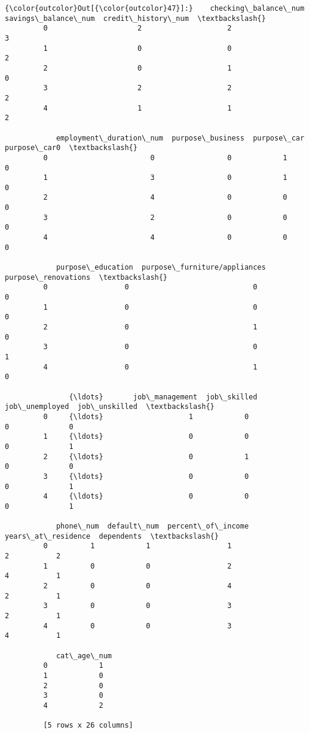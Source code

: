 \documentclass[11pt]{article}
\begin{document}
\begin{Verbatim}[commandchars=\\\{\}]
{\color{outcolor}Out[{\color{outcolor}47}]:}    checking\_balance\_num  savings\_balance\_num  credit\_history\_num  \textbackslash{}
         0                     2                    2                   3   
         1                     0                    0                   2   
         2                     0                    1                   0   
         3                     2                    2                   2   
         4                     1                    1                   2   
         
            employment\_duration\_num  purpose\_business  purpose\_car  purpose\_car0  \textbackslash{}
         0                        0                 0            1             0   
         1                        3                 0            1             0   
         2                        4                 0            0             0   
         3                        2                 0            0             0   
         4                        4                 0            0             0   
         
            purpose\_education  purpose\_furniture/appliances  purpose\_renovations  \textbackslash{}
         0                  0                             0                    0   
         1                  0                             0                    0   
         2                  0                             1                    0   
         3                  0                             0                    1   
         4                  0                             1                    0   
         
               {\ldots}       job\_management  job\_skilled  job\_unemployed  job\_unskilled  \textbackslash{}
         0     {\ldots}                    1            0               0              0   
         1     {\ldots}                    0            0               0              1   
         2     {\ldots}                    0            1               0              0   
         3     {\ldots}                    0            0               0              1   
         4     {\ldots}                    0            0               0              1   
         
            phone\_num  default\_num  percent\_of\_income  years\_at\_residence  dependents  \textbackslash{}
         0          1            1                  1                   2           2   
         1          0            0                  2                   4           1   
         2          0            0                  4                   2           1   
         3          0            0                  3                   2           1   
         4          0            0                  3                   4           1   
         
            cat\_age\_num  
         0            1  
         1            0  
         2            0  
         3            0  
         4            2  
         
         [5 rows x 26 columns]
\end{Verbatim}
\end{document}
